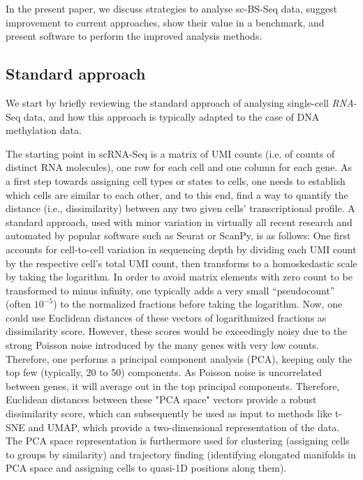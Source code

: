 \documentclass[twocolumn,10pt]{article}
\begin{document}
In the present paper, we discuss strategies to analyse sc-BS-Seq data, suggest improvement to current approaches, show their value in a benchmark, and present software to perform the improved analysis methods.

\subsection{Standard approach}

We start by briefly reviewing the standard approach of analysing single-cell \emph{RNA}-Seq data, and how this approach is typically adapted to the case of DNA methylation data.

The starting point in scRNA-Seq is a matrix of UMI counts (i.e. of counts of distinct RNA molecules), one row for each cell and one column for each gene. As a first step towards assigning cell types or states to cells, one needs to establish which cells are similar to each other, and to this end, find a way to quantify the distance (i.e., dissimilarity) between any two given cells' transcriptional profile. A standard approach, used with minor variation in virtually all recent research and automated by popular software such as Seurat or ScanPy, is as follows: One first accounts for cell-to-cell variation in sequencing depth by dividing each UMI count by the respective cell's total UMI count, then transforms to a homoskedastic scale by taking the logarithm. In order to avoid matrix elements with zero count to be transformed to minus infinity, one typically adds a very small ``pseudocount'' (often $10^{-5}$) to the normalized fractions before taking the logarithm. Now, one could use Euclidean distances of these vectors  of logarithmized fractions as dissimilarity score. However, these scores would be exceedingly noisy due to the strong Poisson noise introduced by the many genes with very low counts. Therefore, one performs a principal component analysis (PCA), keeping only the top few (typically, 20 to 50) components. As Poisson noise is uncorrelated between genes, it will average out in the top principal components. Therefore, Euclidean distances between these "PCA space" vectors provide a robust dissimilarity score, which can subsequently be used as input to methods like t-SNE and UMAP, which provide a two-dimensional representation of the data. The PCA space representation is furthermore used for clustering (assigning cells to groups by similarity) and trajectory finding (identifying elongated manifolds in PCA space and assigning cells to quasi-1D positions along them).
\end{document}
